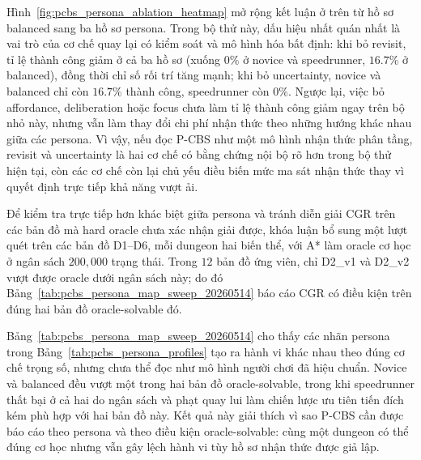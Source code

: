 \documentclass[oneside,a4paper,12pt]{extreport}
\begin{document}
Hình~\ref{fig:pcbs_persona_ablation_heatmap} mở rộng kết luận ở trên từ hồ sơ balanced sang ba hồ sơ persona. Trong bộ thử này, dấu hiệu nhất quán nhất là vai trò của cơ chế quay lại có kiểm soát và mô hình hóa bất định: khi bỏ revisit, tỉ lệ thành công giảm ở cả ba hồ sơ (xuống $0\%$ ở novice và speedrunner, $16.7\%$ ở balanced), đồng thời chỉ số rối trí tăng mạnh; khi bỏ uncertainty, novice và balanced chỉ còn $16.7\%$ thành công, speedrunner còn $0\%$. Ngược lại, việc bỏ affordance, deliberation hoặc focus chưa làm tỉ lệ thành công giảm ngay trên bộ nhỏ này, nhưng vẫn làm thay đổi chi phí nhận thức theo những hướng khác nhau giữa các persona. Vì vậy, nếu đọc P-CBS như một mô hình nhận thức phân tầng, revisit và uncertainty là hai cơ chế có bằng chứng nội bộ rõ hơn trong bộ thử hiện tại, còn các cơ chế còn lại chủ yếu điều biến mức ma sát nhận thức thay vì quyết định trực tiếp khả năng vượt ải.

Để kiểm tra trực tiếp hơn khác biệt giữa persona và tránh diễn giải CGR trên các bản đồ mà hard oracle chưa xác nhận giải được, khóa luận bổ sung một lượt quét trên các bản đồ D1--D6, mỗi dungeon hai biến thể, với A* làm oracle cơ học ở ngân sách $200{,}000$ trạng thái. Trong $12$ bản đồ ứng viên, chỉ D2\_v1 và D2\_v2 vượt được oracle dưới ngân sách này; do đó Bảng~\ref{tab:pcbs_persona_map_sweep_20260514} báo cáo CGR có điều kiện trên đúng hai bản đồ oracle-solvable đó.

\begin{table}[H]
\centering
\small
\setlength{\tabcolsep}{4pt}
\renewcommand{\arraystretch}{1.08}
\caption{Quét P-CBS theo persona trên các bản đồ oracle-solvable}
\label{tab:pcbs_persona_map_sweep_20260514}
\end{table}

Bảng~\ref{tab:pcbs_persona_map_sweep_20260514} cho thấy các nhãn persona trong Bảng~\ref{tab:pcbs_persona_profiles} tạo ra hành vi khác nhau theo đúng cơ chế trọng số, nhưng chưa thể đọc như mô hình người chơi đã hiệu chuẩn. Novice và balanced đều vượt một trong hai bản đồ oracle-solvable, trong khi speedrunner thất bại ở cả hai do ngân sách và phạt quay lui làm chiến lược ưu tiên tiến đích kém phù hợp với hai bản đồ này. Kết quả này giải thích vì sao P-CBS cần được báo cáo theo persona và theo điều kiện oracle-solvable: cùng một dungeon có thể đúng cơ học nhưng vẫn gây lệch hành vi tùy hồ sơ nhận thức được giả lập.
\end{document}
